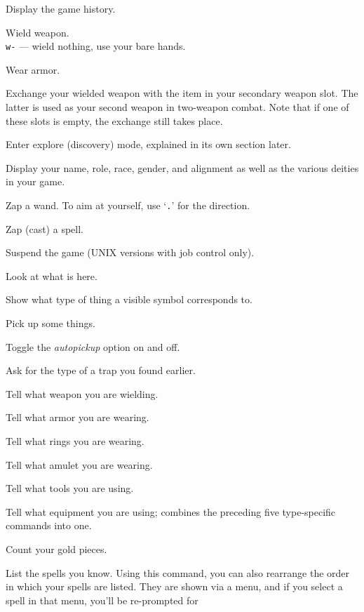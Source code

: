 Display the game history.
\item[\tb{w}]
Wield weapon.\\
{\tt w-} --- wield nothing, use your bare hands.
\item[\tb{W}]
Wear armor.
\item[\tb{x}]
Exchange your wielded weapon with the item in your secondary
weapon slot.  The latter is used as your second weapon in
two-weapon combat.  Note that if one of these slots is empty,
the exchange still takes place.
\item[\tb{X}]
Enter explore (discovery) mode, explained in its own section later.
\item[\tb{\^{}X}]
Display your name, role, race, gender, and alignment as well as
the various deities in your game.
\item[\tb{z}]
Zap a wand.  To aim at yourself, use `{\tt .}' for the direction.
\item[\tb{Z}]
Zap (cast) a spell.
\item[\tb{\^{}Z}]
Suspend the game (UNIX versions with job control only).
\item[\tb{:}]
Look at what is here.
\item[\tb{;}]
Show what type of thing a visible symbol corresponds to.
\item[\tb{,}]
Pick up some things.
\item[\tb{@}]
Toggle the {\it autopickup\/} option on and off.
\item[\tb{\^{}}]
Ask for the type of a trap you found earlier.
\item[\tb{)}]
Tell what weapon you are wielding.
\item[\tb{[}]
Tell what armor you are wearing.
\item[\tb{=}]
Tell what rings you are wearing.
\item[\tb{"}]
Tell what amulet you are wearing.
\item[\tb{(}]
Tell what tools you are using.
\item[\tb{*}]
Tell what equipment you are using; combines the preceding five type-specific
commands into one.
\item[\tb{\$}]
Count your gold pieces.
\item[\tb{+}]
List the spells you know.  Using this command, you can also rearrange
the order in which your spells are listed.  They are shown via a menu,
and if you select a spell in that menu, you'll be re-prompted for
